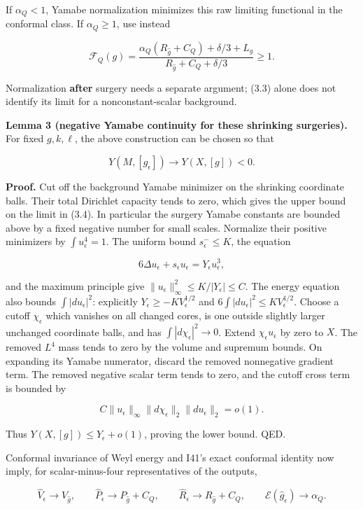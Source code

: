 \documentclass[
  11pt,
]{article}
\begin{document}
If \(\alpha_Q<1\), Yamabe normalization minimizes this raw limiting
functional in the conformal class. If \(\alpha_Q\ge1\), use instead

\[
 \mathcal F_Q(g)=
 \frac{\alpha_Q(R_{\widehat g}+C_Q)+\delta/3+L_g}
      {R_{\widehat g}+C_Q+\delta/3}\ge1.
\]

Normalization \textbf{after} surgery needs a separate argument; (3.3)
alone does not identify its limit for a nonconstant-scalar background.

\textbf{Lemma 3 (negative Yamabe continuity for these shrinking
surgeries).} For fixed \(g,k,\ell\), the above construction can be
chosen so that

\[
 Y(M,[g_\epsilon])\longrightarrow Y(X,[g])<0.
 \tag{3.4}
\]

\textbf{Proof.} Cut off the background Yamabe minimizer on the shrinking
coordinate balls. Their total Dirichlet capacity tends to zero, which
gives the upper bound on the limit in (3.4). In particular the surgery
Yamabe constants are bounded above by a fixed negative number for small
scales. Normalize their positive minimizers by \(\int u_\epsilon^4=1\).
The uniform bound \(s_\epsilon^-\le K\), the equation

\[
 6\Delta u_\epsilon+s_\epsilon u_\epsilon
                      =Y_\epsilon u_\epsilon^3,
\]

and the maximum principle give
\(\|u_\epsilon\|_\infty^2 \le K/|Y_\epsilon|\le C\). The energy equation
also bounds \(\int|du_\epsilon|^2\): explicitly
\(Y_\epsilon\ge-KV_\epsilon^{1/2}\) and
\(6\int|du_\epsilon|^2\le KV_\epsilon^{1/2}\). Choose a cutoff
\(\chi_\epsilon\) which vanishes on all changed cores, is one outside
slightly larger unchanged coordinate balls, and has
\(\int|d\chi_\epsilon|^2\to0\). Extend \(\chi_\epsilon u_\epsilon\) by
zero to \(X\). The removed \(L^4\) mass tends to zero by the volume and
supremum bounds. On expanding its Yamabe numerator, discard the removed
nonnegative gradient term. The removed negative scalar term tends to
zero, and the cutoff cross term is bounded by

\[
 C\|u_\epsilon\|_\infty
       \|d\chi_\epsilon\|_2\|du_\epsilon\|_2=o(1).
\]

Thus \(Y(X,[g])\le Y_\epsilon+o(1)\), proving the lower bound. QED.

Conformal invariance of Weyl energy and I41's exact conformal identity
now imply, for scalar-minus-four representatives of the outputs,

\[
 \widehat V_\epsilon\to V_{\widehat g},\qquad
 \widehat P_\epsilon\to P_{\widehat g}+C_Q,\qquad
 \widehat R_\epsilon\to R_{\widehat g}+C_Q,
 \qquad \mathcal E(\widehat g_\epsilon)\to\alpha_Q.
 \tag{3.5}
\]
\end{document}
